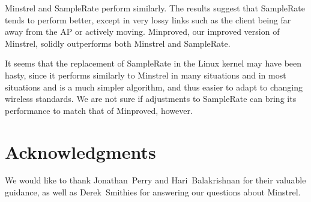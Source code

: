 \documentclass[twocolumn,10pt]{article}
\begin{document}
Minstrel and SampleRate perform similarly.  The results suggest that
SampleRate tends to perform better, except in very lossy
links such as the client being far away from the AP or actively
moving.  Minproved, our improved version of Minstrel, solidly
outperforms both Minstrel and SampleRate.

It seems that the replacement of SampleRate in the Linux kernel may
have been hasty, since it performs similarly to Minstrel in many
situations and in most situations and is a much simpler algorithm, and
thus easier to adapt to changing wireless standards.  We are not sure
if adjustments to SampleRate can bring its performance to match that
of Minproved, however.

\section*{Acknowledgments} \label{sec:acknowledgments}

We would like to thank Jonathan~Perry and Hari~Balakrishnan for their
valuable guidance, as well as Derek~Smithies for answering our
questions about Minstrel.



\end{document}
